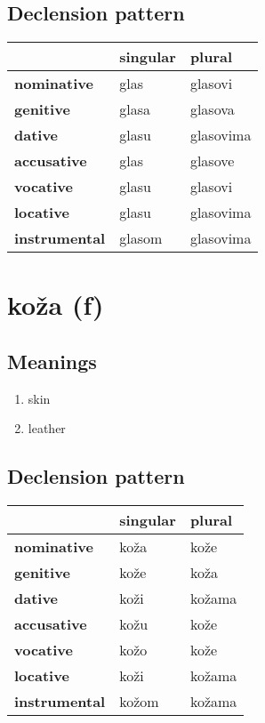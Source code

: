 \subsection*{Declension pattern}
\begin{tabularx}{\linewidth}{Xll}
\toprule
{} & singular &     plural \\
\midrule
\textbf{nominative  } &     glas &    glasovi \\
\textbf{genitive    } &    glasa &    glasova \\
\textbf{dative      } &    glasu &  glasovima \\
\textbf{accusative  } &     glas &    glasove \\
\textbf{vocative    } &    glasu &    glasovi \\
\textbf{locative    } &    glasu &  glasovima \\
\textbf{instrumental} &   glasom &  glasovima \\
\bottomrule
\end{tabularx}

\filbreak
\section{koža (f)}
\subsection*{Meanings}
\begin{enumerate}
\item skin
\item leather
\end{enumerate}
\subsection*{Declension pattern}
\begin{tabularx}{\linewidth}{Xll}
\toprule
{} & singular &  plural \\
\midrule
\textbf{nominative  } &     koža &    kože \\
\textbf{genitive    } &     kože &    koža \\
\textbf{dative      } &     koži &  kožama \\
\textbf{accusative  } &     kožu &    kože \\
\textbf{vocative    } &     kožo &    kože \\
\textbf{locative    } &     koži &  kožama \\
\textbf{instrumental} &    kožom &  kožama \\
\bottomrule
\end{tabularx}

